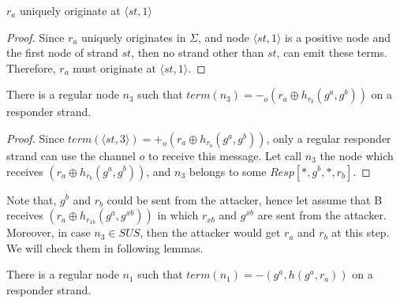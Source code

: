 \begin{Lemma}\label{lemme4.2}
$r_a$ uniquely originate at $\langle st,1 \rangle$ 
\end{Lemma}

\begin{proof}
Since $r_a$ uniquely originates in $\Sigma$, and node $\langle st,1 \rangle$ is a positive node and the first node of strand $st$, then no strand other than $st$, can emit these terms. Therefore, $r_a$ must originate at $\langle st,1 \rangle$.
\end{proof}

\begin{Lemma}\label{lemme4.3}
There is a regular node $n_3$ such that $term(n_3)= -_o(r_a \oplus h_{r_b}(g^a,g^b))$ on a responder strand. 
\end{Lemma}

\begin{proof}
Since $term(\langle st,3 \rangle) = +_o(r_a \oplus h_{r_b}(g^a,g^b))$, only a regular responder strand can use the channel $o$ to receive this message. Let call $n_3$ the node which receives $(r_a \oplus h_{r_b}(g^a,g^b))$, and $n_3$ belongs to some $Resp[*,g^b,*,r_b]$.
\end{proof}

Note that, $g^b$ and $r_b$ could be sent from the attacker, hence let assume that B receives $(r_a \oplus h_{r_{xb}}(g^a,g^{xb}))$ in which $r_{xb}$ and $g^{xb}$ are sent from the attacker. Moreover, in case $n_3 \in SUS$, then the attacker would get $r_a$ and $r_b$ at this step. We will check them in following lemmas. 

\begin{Lemma}\label{lemme4.4}
There is a regular node $n_1$ such that $term(n_1)= -(g^a,h(g^a,r_a))$ on a responder strand. 
\end{Lemma}

